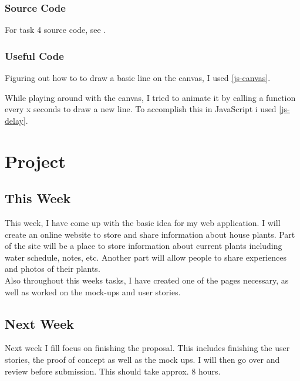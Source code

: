 \documentclass[portfolio.tex.tex]{subfiles}
\begin{document}

				\subsubsection{Source Code}
					For task 4 source code, see .

				\subsubsection{Useful Code}
					Figuring out how to to draw a basic line on the canvas, I used \ref{js-canvas}.

					While playing around with the canvas, I tried to animate it by calling a function every x seconds to draw a new line. To accomplish this in JavaScript i used \ref{js-delay}.

		\section{Project}
			\subsection{This Week}
				\label{project-this-week}
				This week, I have come up with the basic idea for my web application. I will create an online website to store and share information about house plants. Part of the site will be a place to store information about current plants including water schedule, notes, etc. Another part will allow people to share experiences and photos of their plants. \\

				Also throughout this weeks tasks, I have created one of the pages necessary, as well as worked on the mock-ups and user stories.

			\subsection{Next Week}
				Next week I fill focus on finishing the proposal. This includes finishing the user stories, the proof of concept as well as the mock ups. I will then go over and review before submission. This should take approx. 8 hours.

\pagebreak
\end{document}

